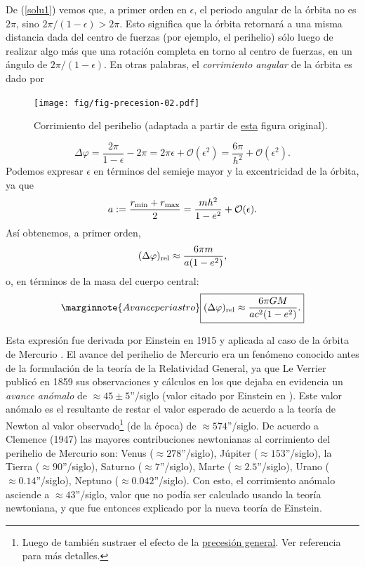 De (\ref{solu1}) vemos que, a primer orden en $\epsilon$, el periodo angular de la órbita no es $2\pi$, sino $2\pi/(1-\epsilon)>2\pi$. Esto significa que la órbita retornará a una misma distancia dada del centro de fuerzas (por ejemplo, el perihelio) sólo luego de realizar algo más que una rotación completa en torno al centro de fuerzas, en un ángulo de $2\pi/(1-\epsilon)$. En otras palabras, el \textit{corrimiento angular} de la órbita es dado por
\begin{figure}[H]
 \begin{center}
\texttt{[image: fig/fig-precesion-02.pdf]}
\caption{Corrimiento del perihelio (adaptada a partir de \href{http://en.wikipedia.org/wiki/File:Perihelion_precession.svg}{esta} figura original).}
\end{center}
\end{figure}
\begin{equation}
\Delta\varphi=\frac{2\pi}{1-\epsilon}-2\pi=2\pi\epsilon+\mathcal{O}(\epsilon^2)=\frac{6\pi}{h^2}+\mathcal{O}(\epsilon^2).
\end{equation}
Podemos expresar $\epsilon$ en términos del semieje mayor y la excentricidad de la órbita, ya que
\begin{equation}
a:=\frac{r_{\rm min}+r_{\rm max}}{2}=\frac{mh^2}{1-e^2}+\mathcal{O}(\epsilon).
\end{equation}
Así obtenemos, a primer orden,
\begin{equation}
 (\Delta\varphi)_{\rm rel}\approx\frac{6\pi m}{a(1-e^2)},
\end{equation}
o, en términos de la masa del cuerpo central:
\begin{equation}\marginnote{Avance periastro}
 \boxed{(\Delta\varphi)_{\rm rel}\approx \frac{6\pi GM}{ac^2(1-e^2)}.}
\end{equation}

Esta expresión fue derivada por Einstein en 1915 y aplicada al caso de la órbita de Mercurio \cite{Einstein15}. El avance del perihelio de Mercurio era un fenómeno conocido antes de la formulación de la teoría de la Relatividad General, ya que Le Verrier \cite{LeVerrier} publicó en 1859 sus observaciones y cálculos en los que dejaba en evidencia un \textit{avance anómalo} de $\approx 45\pm 5$''/siglo  (valor citado por Einstein en \cite{Einstein15}). Este valor anómalo es el resultante de restar el valor esperado de acuerdo a la teoría de Newton al valor observado\footnote{Luego de también sustraer el efecto de la \href{http://en.wikipedia.org/wiki/Axial_precession}{precesión general}. Ver referencia \cite{Clemence47} para más detalles.} (de la época) de $\approx 574$''/siglo.  De acuerdo a Clemence (1947) \cite{Clemence47} las mayores contribuciones newtonianas al corrimiento del perihelio de Mercurio son: Venus ($\approx 278$''/siglo), Júpiter ($\approx 153$''/siglo), la Tierra ($\approx 90$''/siglo), Saturno ($\approx 7$''/siglo), Marte ($\approx 2.5$''/siglo), Urano ($\approx 0.14$''/siglo), Neptuno ($\approx 0.042$''/siglo). Con esto, el corrimiento anómalo asciende a $\approx 43$''/siglo, valor que no podía ser calculado usando la teoría newtoniana, y que fue entonces explicado por la nueva teoría de Einstein.

